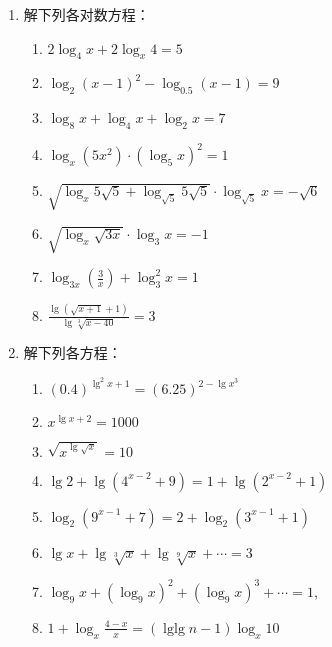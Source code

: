 \begin{enumerate}
\item 解下列各对数方程：
  \begin{enumerate}
  \item  $2 \log _{4} x+2 \log _{x} 4=5$ 
  \item  $\log _{2}(x-1)^{2}-\log _{0.5}(x-1)=9$
  \item  $\log _{8} x+\log _{4} x+\log _{2} x=7$
  \item  $\log _{x}\left(5 x^{2}\right) \cdot\left(\log _{5} x\right)^{2}=1$
  \item  $\sqrt{\log _{x} 5 \sqrt{5}+\log _{\sqrt{5}} 5 \sqrt{5}} \cdot \log _{\sqrt{5}} x=-\sqrt{6}$
  \item  $\sqrt{\log _{x} \sqrt{3 x}} \cdot \log _{3} x=-1$
  \item  $\log _{3 x}\left(\frac{3}{x}\right)+\log _{3}^{2} x=1$
  \item $\frac{\lg\left(\sqrt{x+1}+1\right)}{\lg\sqrt[3]{x-40}}=3$
  \end{enumerate}

  \item 解下列各方程：
\begin{enumerate}
  \item $(0.4)^{\lg^2 x+1}=(6.25)^{2-\lg x^3}$
  \item $x^{\lg x+2}=1000$
  \item $\sqrt{x^{\lg \sqrt{x}}}=10$
\item $\lg 2+\lg \left(4^{x-2}+9\right)=1+\lg \left(2^{x-2}+1\right)$
\item $\log _{2}\left(9^{x-1}+7\right)=2+\log _{2}\left(3^{x-1}+1\right)$
\item $\lg x+\lg \sqrt[3]{x}+\lg  \sqrt[9]{x}+\cdots=3$
\item $\log _{9} x+\left(\log _{9} x\right)^{2}+\left(\log _{9} x\right)^{3}+\cdots=1$,
\item $ 1+\log _{x} \frac{4-x}{x}=(\operatorname{lglg} n-1) \log _{x} 10$
\end{enumerate}


\end{enumerate}
